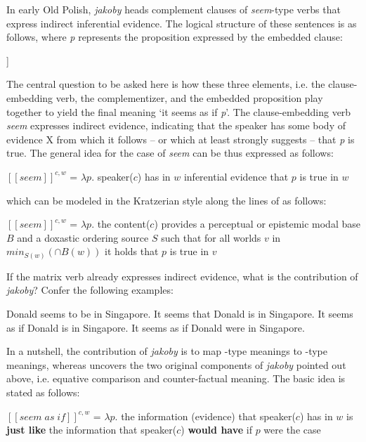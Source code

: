 \documentclass[output=paper
,modfonts
,nonflat]{langsci/langscibook}
\begin{document}
\noindent In early Old Polish, \emph{jakoby} heads complement clauses of \emph{seem}-type verbs that express indirect inferential evidence. The logical structure of these sentences is as follows, where \emph{p} represents the proposition expressed by the embedded clause:

\ea\relax [\emph{seem} [\emph{jakoby} \emph{p}]]  \z

The central question to be asked here is how these three elements, i.e. the clause-embedding verb, the complementizer, and the embedded proposition play together to yield the final meaning `it seems as if \emph{p}'. The clause-embedding verb \emph{seem} expresses indirect evidence, indicating that the speaker has some body of evidence X from which it follows – or which at least strongly suggests – that \emph{p} is true. The general idea for the case of \emph{seem} can be thus expressed as follows: 

\ea	\([\![seem]\!]^{c,w}\) =  \( \lambda p . \) speaker(\( c \)) has in \( w \) inferential evidence that \( p \) is true in \( w \) \z

which can be modeled in the Kratzerian style along the lines of \textcite{Faller2011} as follows:

\ea	\([\![seem]\!]^{c,w}\) =  \( \lambda p . \) the content(\( c \)) provides a perceptual or epistemic modal base \( B \) and a doxastic ordering source \( S \) such that for all worlds \( v \) in \( min_{S(w)} (\cap B(w))\) it holds that \( p \) is true in \( v \)       \z

If the matrix verb already expresses indirect evidence, what is the contribution of \emph{jakoby}? Confer the following examples: 

\ea	\ea	Donald seems to be in Singapore. \label{Donald3}
	\ex	It seems that Donald is in Singapore. \label{Donald}
	\ex	It seems as if Donald is in Singapore.
	\ex	It seems as if Donald were in Singapore. \label{Donald2}
\z
\z

In a nutshell, the contribution of \emph{jakoby} is to map -type meanings to -type meanings, whereas   uncovers the two original components of \emph{jakoby} pointed out above, i.e. equative comparison and counter-factual meaning. The basic idea is stated as follows: 

\ea\([\![seem \; as \; if]\!]^{c,w}\) =  \( \lambda p . \) the information (evidence) that speaker(\( c \)) has in \( w \) is \textbf{just like} the information that speaker(\( c \)) \textbf{would have} if \( p \) were the case \label{counter}\z
\end{document}
